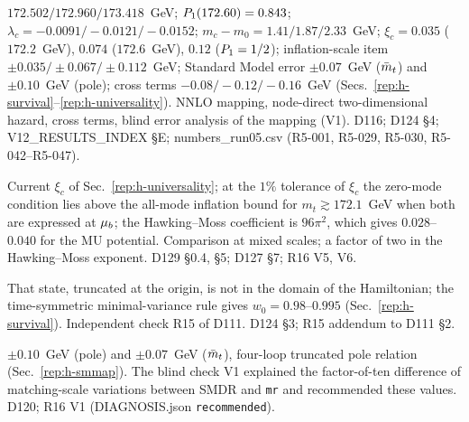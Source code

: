 \begin{description}
{$172.502/\allowbreak 172.960/\allowbreak 173.418$~GeV; $P_1(172.60)=0.843$; $\lambda_c=-0.0091/\allowbreak{-}0.0121/\allowbreak{-}0.0152$; $m_c-m_0=1.41/\allowbreak 1.87/\allowbreak 2.33$~GeV; $\xi_c=0.035$ ($172.2$~GeV), $0.074$ ($172.6$~GeV), $0.12$ ($P_1=1/2$); inflation-scale item $\pm0.035/\pm0.067/\pm0.112$~GeV; Standard Model error $\pm0.07$~GeV ($\bar m_t$) and $\pm0.10$~GeV (pole); cross terms $-0.08/\allowbreak{-}0.12/\allowbreak{-}0.16$~GeV (Secs.~\ref{rep:h-survival}--\ref{rep:h-universality}).}
{NNLO mapping, node-direct two-dimensional hazard, cross terms, blind error analysis of the mapping (V1).}
{D116; D124 \S4; V12\_RESULTS\_INDEX \S E; numbers\_run05.csv (R5-001, R5-029, R5-030, R5-042--R5-047).}

{Current $\xi_c$ of Sec.~\ref{rep:h-universality}; at the $1\%$ tolerance of $\xi_c$ the zero-mode condition lies above the all-mode inflation bound for $m_t\gtrsim172.1$~GeV when both are expressed at $\mu_b$; the Hawking--Moss coefficient is $96\pi^2$, which gives $0.028$--$0.040$ for the MU potential.} %
{Comparison at mixed scales; a factor of two in the Hawking--Moss exponent.}
{D129 \S0.4, \S5; D127 \S7; R16 V5, V6.}

{That state, truncated at the origin, is not in the domain of the Hamiltonian; the time-symmetric minimal-variance rule gives $w_0=0.98$--$0.995$ (Sec.~\ref{rep:h-survival}).}
{Independent check R15 of D111.}
{D124 \S3; R15 addendum to D111 \S2.}

{$\pm0.10$~GeV (pole) and $\pm0.07$~GeV ($\bar m_t$), four-loop truncated pole relation (Sec.~\ref{rep:h-smmap}).}
{The blind check V1 explained the factor-of-ten difference of matching-scale variations between SMDR and \texttt{mr} and recommended these values.}
{D120; R16 V1 (DIAGNOSIS.json \texttt{recommended}).}


\end{description}

